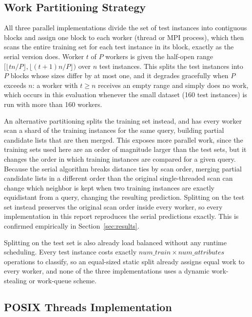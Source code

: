 \documentclass[conference]{IEEEtran}
\begin{document}
\subsection{Work Partitioning Strategy}
\label{sec:partition}

All three parallel implementations divide the set of test instances into
contiguous blocks and assign one block to each worker (thread or MPI
process), which then scans the entire training set for each test instance
in its block, exactly as the serial version does. Worker $t$ of $P$ workers
is given the half-open range $[\lfloor tn/P \rfloor, \lfloor (t+1)n/P
\rfloor)$ over $n$ test instances. This splits the test instances into $P$
blocks whose sizes differ by at most one, and it degrades gracefully when
$P$ exceeds $n$: a worker with $t \geq n$ receives an empty range and
simply does no work, which occurs in this evaluation whenever the small
dataset (160 test instances) is run with more than 160 workers.

An alternative partitioning splits the training set instead, and has every
worker scan a shard of the training instances for the same query,
building partial candidate lists that are then merged. This exposes more
parallel work, since the training sets used here are an order of magnitude
larger than the test sets, but it changes the order in which training
instances are compared for a given query. Because the serial algorithm
breaks distance ties by scan order, merging partial candidate lists in a
different order than the original single-threaded scan can change which
neighbor is kept when two training instances are exactly equidistant from
a query, changing the resulting prediction. Splitting on the test set
instead preserves the original scan order inside every worker, so every
implementation in this report reproduces the serial predictions exactly.
This is confirmed empirically in Section~\ref{sec:results}.

Splitting on the test set is also already load balanced without any
runtime scheduling. Every test instance costs exactly
$\mathit{num\_train} \times \mathit{num\_attributes}$ operations to
classify, so an equal-sized static split already assigns equal work to
every worker, and none of the three implementations uses a dynamic
work-stealing or work-queue scheme.

\subsection{POSIX Threads Implementation}
\end{document}
